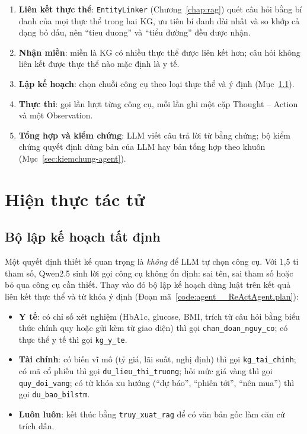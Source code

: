 \begin{enumerate}
  \item \textbf{Liên kết thực thể}: \texttt{EntityLinker} (Chương~\ref{chap:rag}) quét câu hỏi bằng bí danh của mọi
        thực thể trong hai KG, ưu tiên bí danh dài nhất và so khớp cả dạng bỏ dấu, nên ``tieu duong'' và ``tiểu
        đường'' đều được nhận.
  \item \textbf{Nhận miền}: miền là KG có nhiều thực thể được liên kết hơn; câu hỏi không liên kết được thực thể nào
        mặc định là y tế.
  \item \textbf{Lập kế hoạch}: chọn chuỗi công cụ theo loại thực thể và ý định (Mục~\ref{sec:laplkh}).
  \item \textbf{Thực thi}: gọi lần lượt từng công cụ, mỗi lần ghi một cặp Thought -- Action và một Observation.
  \item \textbf{Tổng hợp và kiểm chứng}: LLM viết câu trả lời từ bằng chứng; bộ kiểm chứng quyết định dùng bản của
        LLM hay bản tổng hợp theo khuôn (Mục~\ref{sec:kiemchung-agent}).
\end{enumerate}


\section{Hiện thực tác tử}\label{sec:hienthuc-agent}
\subsection{Bộ lập kế hoạch tất định}\label{sec:laplkh}
Một quyết định thiết kế quan trọng là \emph{không} để LLM tự chọn công cụ. Với 1,5 tỉ tham số, Qwen2.5 sinh lời gọi
công cụ không ổn định: sai tên, sai tham số hoặc bỏ qua công cụ cần thiết. Thay vào đó bộ lập kế hoạch dùng luật trên
kết quả liên kết thực thể và từ khóa ý định (Đoạn mã~\ref{code:agent__ReActAgent.plan}):

\begin{itemize}
  \item \textbf{Y tế}: có chỉ số xét nghiệm (HbA1c, glucose, BMI, trích từ câu hỏi bằng biểu thức chính quy hoặc gửi
        kèm từ giao diện) thì gọi \texttt{chan\_doan\_nguy\_co}; có thực thể y tế thì gọi \texttt{kg\_y\_te}.
  \item \textbf{Tài chính}: có biến vĩ mô (tỷ giá, lãi suất, nghị định) thì gọi \texttt{kg\_tai\_chinh}; có mã cổ
        phiếu thì gọi \texttt{du\_lieu\_thi\_truong}; hỏi mức giá vàng thì gọi \texttt{quy\_doi\_vang}; có từ khóa
        xu hướng (``dự báo'', ``phiên tới'', ``nên mua'') thì gọi \texttt{du\_bao\_bilstm}.
  \item \textbf{Luôn luôn}: kết thúc bằng \texttt{truy\_xuat\_rag} để có văn bản gốc làm căn cứ trích dẫn.
\end{itemize}

